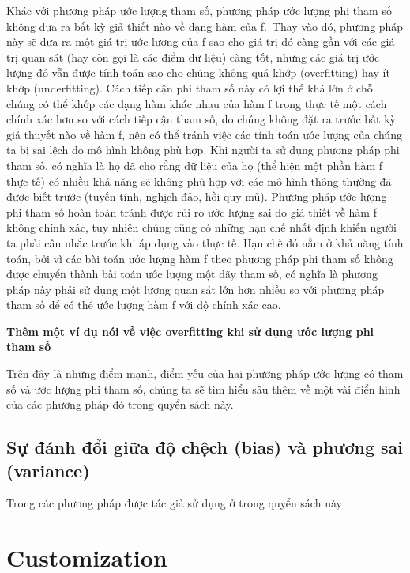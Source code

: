 \documentclass[
  12pt,
]{krantz}
\begin{document}
Khác với phương pháp ước lượng tham số, phương pháp ước lượng phi tham số không đưa ra bất kỳ giả thiết nào về dạng hàm của f.~Thay vào đó, phương pháp này sẽ đưa ra một giá trị ước lượng của f sao cho giá trị đó càng gần với các giá trị quan sát (hay còn gọi là các điểm dữ liệu) càng tốt, nhưng các giá trị ước lượng đó vẫn được tính toán sao cho chúng không quá khớp (overfitting) hay ít khớp (underfitting). Cách tiếp cận phi tham số này có lợi thế khá lớn ở chỗ chúng có thể khớp các dạng hàm khác nhau của hàm f trong thực tế một cách chính xác hơn so với cách tiếp cận tham số, do chúng không đặt ra trước bất kỳ giả thuyết nào về hàm f, nên có thể tránh việc các tính toán ước lượng của chúng ta bị sai lệch do mô hình không phù hợp. Khi người ta sử dụng phương pháp phi tham số, có nghĩa là họ đã cho rằng dữ liệu của họ (thể hiện một phần hàm f thực tế) có nhiều khả năng sẽ không phù hợp với các mô hình thông thường đã được biết trước (tuyến tính, nghịch đảo, hồi quy mũ). Phương pháp ước lượng phi tham số hoàn toàn tránh được rủi ro ước lượng sai do giả thiết về hàm f không chính xác, tuy nhiên chúng cũng có những hạn chế nhất định khiến người ta phải cân nhắc trước khi áp dụng vào thực tế. Hạn chế đó nằm ở khả năng tính toán, bởi vì các bài toán ước lượng hàm f theo phương pháp phi tham số không được chuyển thành bài toán ước lượng một dãy tham số, có nghĩa là phương pháp này phải sử dụng một lượng quan sát lớn hơn nhiều so với phương pháp tham số để có thể ước lượng hàm f với độ chính xác cao.

\textbf{Thêm một ví dụ nói về việc overfitting khi sử dụng ước lượng phi tham số}

Trên đây là những điểm mạnh, điểm yếu của hai phương pháp ước lượng có tham số và ước lượng phi tham số, chúng ta sẽ tìm hiểu sâu thêm về một vài điển hình của các phương pháp đó trong quyển sách này.

\hypertarget{sux1ef1-ux111uxe1nh-ux111ux1ed5i-giux1eefa-ux111ux1ed9-chux1ec7ch-bias-vuxe0-phux1b0ux1a1ng-sai-variance}{%
\section{Sự đánh đổi giữa độ chệch (bias) và phương sai (variance)}\label{sux1ef1-ux111uxe1nh-ux111ux1ed5i-giux1eefa-ux111ux1ed9-chux1ec7ch-bias-vuxe0-phux1b0ux1a1ng-sai-variance}}

Trong các phương pháp được tác giả sử dụng ở trong quyển sách này

\hypertarget{customization}{%
\chapter{Customization}\label{customization}}
\end{document}
